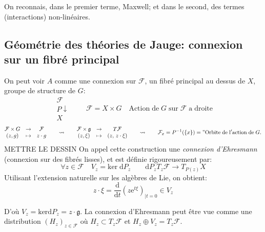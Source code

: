 \documentclass[a4paper,11pt]{article}
\renewcommand{\d}{{\mathrm{d}}}
\newcommand{\e}{{\mathrm{e}}}
\begin{document}
On reconnais, dans le premier terme, Maxwell; et dans le second, des termes (interactions) non-linéaires.

\subsection{Géométrie des théories de Jauge: connexion sur un fibré principal}
On peut voir $A$ comme une connexion sur $\mathcal{F}$, un fibré principal au dessus de $X$, groupe de structure de $G$:
$$\begin{matrix}
\mathcal{F}\\
P \downarrow \quad \\
X
\end{matrix}\quad \mathcal{F}=X\times G
\quad \mathrm{Action}\;\mathrm{de}\;G\;\mathrm{sur}\;\mathcal{F}\; \mathrm{a} \;\mathrm{droite}$$
$$\begin{matrix}
\mathcal{F}\times G & \to & \mathcal{F}\\
(z,g) & \mapsto & z \cdot g
\end{matrix}
\quad\quad \rightsquigarrow \quad\quad
\begin{matrix}
\mathcal{F}\times \mathfrak{g} & \to & T\mathcal{F}\\
(z,\xi) & \mapsto & (z,\,z \cdot \xi)
\end{matrix}
\quad\quad \rightsquigarrow \quad\quad
\mathcal{F}_x = P^{-1}(\{x\}) = "\mathrm{Orbite}\;\mathrm{de}\;\mathrm{l}'\mathrm{action}\;\mathrm{de}\; G.
$$
\color{red} METTRE LE DESSIN \color{black}
On appel cette construction une \emph{connexion d'Ehresmann} (connexion sur des fibrés lisses), et est définie rigoureusement par:
$$\forall z \in \mathcal{F} \quad V_z = \mathrm{ker} \; \d P_z \quad \quad \d P_z T_z \mathcal{F} \to T_{P(z)} X$$
Utilisant l'extension naturelle sur les algèbres de Lie, on obtient:
$$z\cdot \xi = \frac{\d}{\d t}\left(z\e^{t\xi}\right)_{|t=0} \in V_z$$

D'où
$V_z = \mathrm{ker} \d P_z = z \cdot \mathfrak{g}$. 
La connexion d'Ehresmann peut être vue comme une distribution $(H_z)_{z\in\mathcal{F}}$ où $H_z \subset T_z \mathcal{F}$ et $H_z \oplus V_z = T_z \mathcal{F}$.
\end{document}
